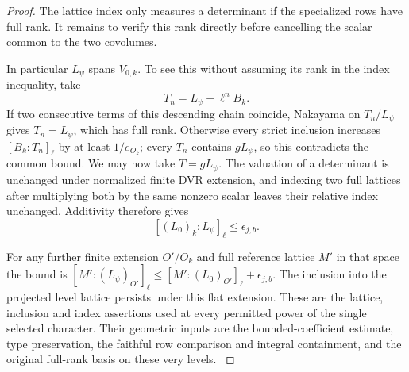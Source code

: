 \begin{proof}
The lattice index only measures a determinant if the specialized rows have full rank. It remains to verify this rank directly before cancelling the scalar common to the two covolumes.

In particular \(L_\psi\) spans \(V_{0,k}\). To see this
without assuming its rank in the index inequality, take
\[
 T_n=L_\psi+\ell^n B_k.
\]
If two consecutive terms of this
descending chain coincide, Nakayama on \(T_n/L_\psi\)
gives \(T_n=L_\psi\), which has full rank. Otherwise every
strict inclusion increases \([B_k:T_n]_\ell\) by at least
\(1/e_{O_k}\); every \(T_n\) contains \(g L_\psi\), so
this contradicts the common bound. We may now take
\(T=gL_\psi\). The valuation of a determinant is unchanged
under normalized finite DVR extension, and indexing two
full lattices after multiplying both by the same nonzero
scalar leaves their relative index unchanged. Additivity
therefore gives
\[
           [(L_0)_k:L_\psi]_\ell\le\epsilon_{j,b}.
\]

For any further finite extension \(O'/O_k\) and full
reference lattice \(M'\) in that space the bound is
\(
 [M':(L_\psi)_{O'}]_\ell
 \le [M':(L_0)_{O'}]_\ell+\epsilon_{j,b}.
\)
The inclusion into the projected level lattice persists under
this flat extension. These are the lattice, inclusion and
index assertions used at every permitted power of the
single selected character. Their geometric inputs are the
bounded-coefficient estimate, type preservation, the faithful row
comparison and integral containment, and the original
full-rank basis on these very levels. \label{cor:twist-row-lattices-1}
\end{proof}
